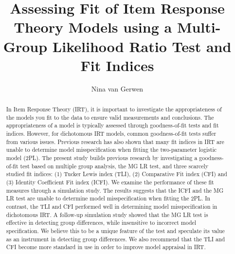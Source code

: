 \documentclass[Royal,sageapa,times,doublespace]{sagej}
\begin{document}

\title{Assessing Fit of Item Response Theory Models using a Multi-Group Likelihood Ratio Test and Fit Indices}

\author{Nina van Gerwen } %




\begin{abstract}
In Item Response Theory (IRT), it is important to investigate the appropriateness of the models you fit to the data to ensure valid measurements and conclusions. The appropriateness of a model is typically assessed through goodness-of-fit tests and fit indices. However, for dichotomous IRT models, common goodness-of-fit tests suffer from various issues. Previous research has also shown that many fit indices in IRT are unable to determine model misspecification when fitting the two-parameter logistic model (2PL). The present study builds previous research by investigating a goodness-of-fit test based on multiple group analysis, the MG LR test, and three scarcely studied fit indices: (1) Tucker Lewis index (TLI), (2) Comparative Fit index (CFI) and (3) Identity Coefficient Fit index (ICFI). We examine the performance of these fit measures through a simulation study. The results suggests that the ICFI and the MG LR test are unable to determine model misspecification when fitting the 2PL. In contrast, the TLI and CFI performed well in determining model misspecification in dichotomous IRT. A follow-up simulation study showed that the MG LR test is effective in detecting group differences, while insensitive to incorrect model specification. We believe this to be a unique feature of the test and speculate its value as an instrument in detecting group differences. We also recommend that the TLI and CFI become more standard in use in order to improve model appraisal in IRT.
\end{abstract}


\maketitle
\end{document}
